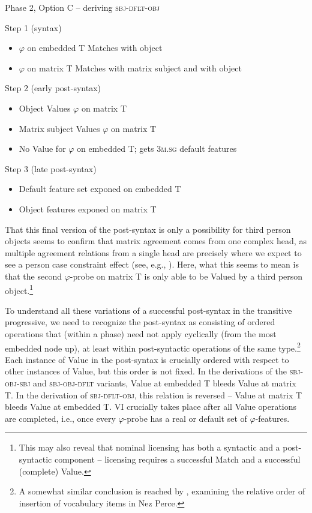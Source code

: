 \documentclass[output=paper
,modfonts
,nonflat]{langsci/langscibook}
\begin{document}
\begin{exe}
\ex Phase 2, Option C -- deriving \textsc{sbj-dflt-obj} \label{phase2-3}
\begin{xlist}
\ex Step 1 (syntax) \begin{itemize}
            \item $\varphi$ on embedded T Matches with object
            \item $\varphi$ on matrix T Matches with matrix subject and with object
            \end{itemize}
\ex Step 2 (early post-syntax) \begin{itemize}
            \item Object Values $\varphi$ on matrix T
            \item Matrix subject Values $\varphi$ on matrix T
            \item No Value for $\varphi$ on embedded T; gets 3\textsc{m.sg} default features
            \end{itemize}
\ex Step 3 (late post-syntax) \begin{itemize}
            \item Default feature set exponed on embedded T
            \item Object features exponed on matrix T
            \end{itemize}
\end{xlist}
\end{exe}

\noindent That this final version of the post-syntax is only a possibility for third person objects seems to confirm that matrix agreement comes from one complex head, as multiple agreement relations from a single head are precisely where we expect to see a person case constraint effect (see, e.g., \citealt{Anagnostopoulou03,BejarRezac03,AdgerHarbour07,Rezac08,Rezac11}). Here, what this seems to mean is that the second $\varphi$-probe on matrix T is only able to be Valued by a third person object.\footnote{This may also reveal that nominal licensing has both a syntactic and a post-syntactic component -- licensing requires a successful Match and a successful (complete) Value.}

To understand all these variations of a successful post-syntax in the transitive progressive, we need to recognize the post-syntax as consisting of ordered operations that (within a phase) need not apply cyclically (from the most embedded node up), at least within post-syntactic operations of the same type.\footnote{A somewhat similar conclusion is reached by \citet{DealWolf17}, examining the relative order of insertion of vocabulary items in Nez Perce.} Each instance of Value in the post-syntax is crucially ordered with respect to other instances of Value, but this order is not fixed. In the derivations of the \textsc{sbj-obj-sbj} and \textsc{sbj-obj-dflt} variants, Value at embedded T bleeds Value at matrix T. In the derivation of \textsc{sbj-dflt-obj}, this relation is reversed -- Value at matrix T bleeds Value at embedded T. VI crucially takes place after all Value operations are completed, i.e., once every $\varphi$-probe has a real or default set of $\varphi$-features.
\end{document}
